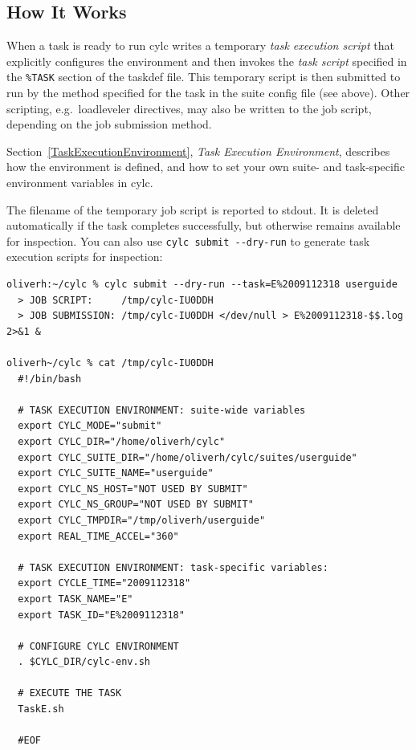 \documentclass[11pt,a4paper]{article}
\begin{document}
\subsection{How It Works}
\label{HowItWorks}

\lstset{language=cylctaskdef}

When a task is ready to run cylc writes a temporary {\em task execution
script} that explicitly configures the environment and then invokes the
{\em task script} specified in the \lstinline=%TASK= section of the
taskdef file. This temporary script is then submitted to run by the
method specified for the task in the suite config file (see above).
Other scripting, e.g.\ loadleveler directives, may also be written to
the job script, depending on the job submission method.

\lstset{language=bash}

Section~\ref{TaskExecutionEnvironment}, {\em Task Execution
Environment}, describes how the environment is defined, and how to set
your own suite- and task-specific environment variables in cylc.

The filename of the temporary job script is reported to
stdout. It is deleted automatically if the task completes successfully,
but otherwise remains available for inspection.  You can also use
\lstinline=cylc submit --dry-run= to generate task
execution scripts for inspection:


\begin{lstlisting}
oliverh:~/cylc % cylc submit --dry-run --task=E%2009112318 userguide
  > JOB SCRIPT:     /tmp/cylc-IU0DDH
  > JOB SUBMISSION: /tmp/cylc-IU0DDH </dev/null > E%2009112318-$$.log 2>&1 &
  
oliverh~/cylc % cat /tmp/cylc-IU0DDH
  #!/bin/bash
  
  # TASK EXECUTION ENVIRONMENT: suite-wide variables
  export CYLC_MODE="submit"
  export CYLC_DIR="/home/oliverh/cylc"
  export CYLC_SUITE_DIR="/home/oliverh/cylc/suites/userguide"
  export CYLC_SUITE_NAME="userguide"
  export CYLC_NS_HOST="NOT USED BY SUBMIT"
  export CYLC_NS_GROUP="NOT USED BY SUBMIT"
  export CYLC_TMPDIR="/tmp/oliverh/userguide"
  export REAL_TIME_ACCEL="360"
  
  # TASK EXECUTION ENVIRONMENT: task-specific variables:
  export CYCLE_TIME="2009112318"
  export TASK_NAME="E"
  export TASK_ID="E%2009112318"
  
  # CONFIGURE CYLC ENVIRONMENT
  . $CYLC_DIR/cylc-env.sh
  
  # EXECUTE THE TASK
  TaskE.sh 
  
  #EOF
\end{lstlisting}
\end{document}

